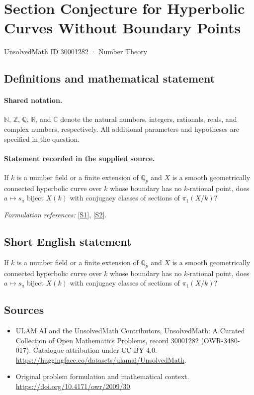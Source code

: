 \documentclass[11pt]{article}
\newcommand{\sref}[2]{\hyperlink{source:#1:#2}{[S#2]}}
\begin{document}
\setcounter{section}{30001281}
\section{Section Conjecture for Hyperbolic Curves Without Boundary Points}\label{30001282}
{\small UnsolvedMath ID 30001282 · Number Theory}
\subsection{Definitions and mathematical statement}

\paragraph{Shared notation.}$\mathbb N$, $\mathbb Z$, $\mathbb Q$, $\mathbb R$, and $\mathbb C$ denote the natural numbers, integers, rationals, reals, and complex numbers, respectively. All additional parameters and hypotheses are specified in the question.


\paragraph{Statement recorded in the supplied source.}
If $k$ is a number field or a finite extension of $\mathbb{Q}_p$ and $X$ is a smooth geometrically connected hyperbolic curve over $k$ whose boundary has no $k$-rational point, does $a\mapsto s_a$ biject $X(k)$ with conjugacy classes of sections of $\pi_1(X/k)$?
\par\smallskip\textit{Formulation references:} \sref{30001282}{1}, \sref{30001282}{2}.
\subsection{Short English statement}
If $k$ is a number field or a finite extension of $\mathbb{Q}_p$ and $X$ is a smooth geometrically connected hyperbolic curve over $k$ whose boundary has no $k$-rational point, does $a\mapsto s_a$ biject $X(k)$ with conjugacy classes of sections of $\pi_1(X/k)$?
\subsection{Sources}
\begin{itemize}
\item[\hypertarget{source:30001282:1}{S1}] ULAM.AI and the UnsolvedMath Contributors, UnsolvedMath: A Curated Collection of Open Mathematics Problems, record 30001282 (OWR-3480-017). Catalogue attribution under CC BY 4.0.
\url{https://huggingface.co/datasets/ulamai/UnsolvedMath}.
\item[\hypertarget{source:30001282:2}{S2}] Original problem formulation and mathematical context.
\url{https://doi.org/10.4171/owr/2009/30}.
\end{itemize}
\label{end:30001282}
\end{document}
